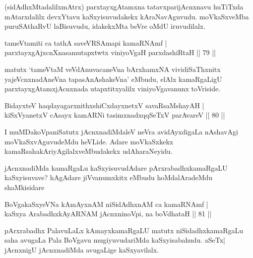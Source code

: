 \begin{artha}
(sidAdhxMtadalilxmAtrx) parxtayxgAtamxna tatavxparijAcnxnavu huTiTxda mAtarxdalilx devxYtavu kaSxyisuvudakekx kAraNavAguvudu. moVkaSxveMba puruSAthaRvU laBisuvudu, idakekxMta beVre oMdU iruvudilalx.
\end{artha}

\begin{shl}
tameVtamiti ca tathA saveVRSAmapi kamaRNAmf |\\
parxtayxgAjxcnXnasamutapxtwtx viniyoVgaH parxdashiRtaH \hfill || 79 ||
\end{shl}

\begin{artha}
matutx `tameVtaM veVdAnuvacaneVna bArxhamxNA vividiSaThxnitx yajeVcnxnadAneVna tapasA\s nAshakeVna' eMbudu, elAlx kamaRgaLigU parxtayxgAtamxjAcnxnada utapxtitxyalilx viniyoVgavanunx toVriside.
\end{artha}

\begin{shl}
BidayxteV haqdayagarxnithxshiCxdayxnetxV savaRsaMshayAH |\\
kiSxVyanetxV cAsayx kamARNi tasimxnadxqqSeTxV parAvareV \hfill || 80 ||
\end{shl}

\begin{artha}
I muMDakoVpaniSatutx jAcnxnadiMdaleV neVra avidAyxdigaLa nAshavAgi moVkaSxvAguvudeMdu heVLide. Adare moVkaSxkekx kamaRsahakAriyAgilalxveMbudakekx udAharaNeyidu.
\end{artha}

\begin{artha}
jAcnxnadiMda kamaRgaLu kaSxyisuvudAdare pArxrabadhxkamaRgaLU kaSxyisuvave? hAgAdare jiVvanumxkitx eMbudu hoMdalAradeMdu shaMkisidare
\end{artha}


\begin{shl}
BoVgakaSxyeVNa kAmAyxnAM niSidAdhxnAM ca kamaRNAmf |\\
kaSxya ArabadhxkAyARNAM jAcnxninoV\s pi, na boVdhataH \hfill || 81 ||
\end{shl}

\begin{artha}
pArxrabadhx PalavuLaLx kAmayxkamaRgaLU matutx niSidadhxkamaRgaLu saha avugaLa Pala BoVgavu mugiyuvudariMda kaSxyisabahudu. aSeTx| jAcnxnigU jAcnxnadiMda avugaLige kaSxyavilalx.
\end{artha}

